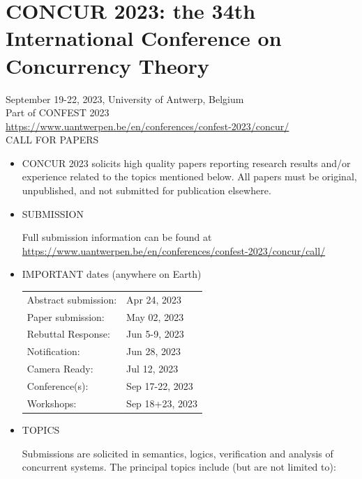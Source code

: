 \documentclass[prodmode,acmtecs]{acmsmall} %
\begin{document}
\begin{itemize}
\end{itemize}\section{CONCUR 2023: the 34th International Conference on Concurrency Theory}\label{CONCUR2023}  September 19-22, 2023, University of Antwerp, Belgium\\ 
  Part of CONFEST 2023\\ 
  \href{https://www.uantwerpen.be/en/conferences/confest-2023/concur/}{https://www.uantwerpen.be/en/conferences/confest-2023/concur/}\\ 
CALL FOR PAPERS 

\begin{itemize}\item  CONCUR 2023 solicits high quality papers reporting research results and/or experience related to the topics mentioned below. All papers must be original, unpublished, and not submitted for publication elsewhere. 
 
\item  SUBMISSION  
 
  Full submission information can be found at \href{https://www.uantwerpen.be/en/conferences/confest-2023/concur/call/}{https://www.uantwerpen.be/en/conferences/confest-2023/concur/call/} 
 
\item  IMPORTANT dates (anywhere on Earth) 
 
\begin{tabulary}{\linewidth}{LL}Abstract submission:  & Apr 24, 2023 \\
Paper submission:  & May 02, 2023 \\
Rebuttal Response:  & Jun 5-9, 2023 \\
Notification:  & Jun 28, 2023 \\
Camera Ready:  & Jul 12, 2023 \\
Conference(s):  & Sep 17-22, 2023 \\
Workshops:  & Sep 18+23, 2023 \\
\end{tabulary}
 
\item  TOPICS 
 
  Submissions are solicited in semantics, logics, verification and analysis of concurrent systems. The principal topics include (but are not limited to): 
 

\end{itemize}
\end{document}

